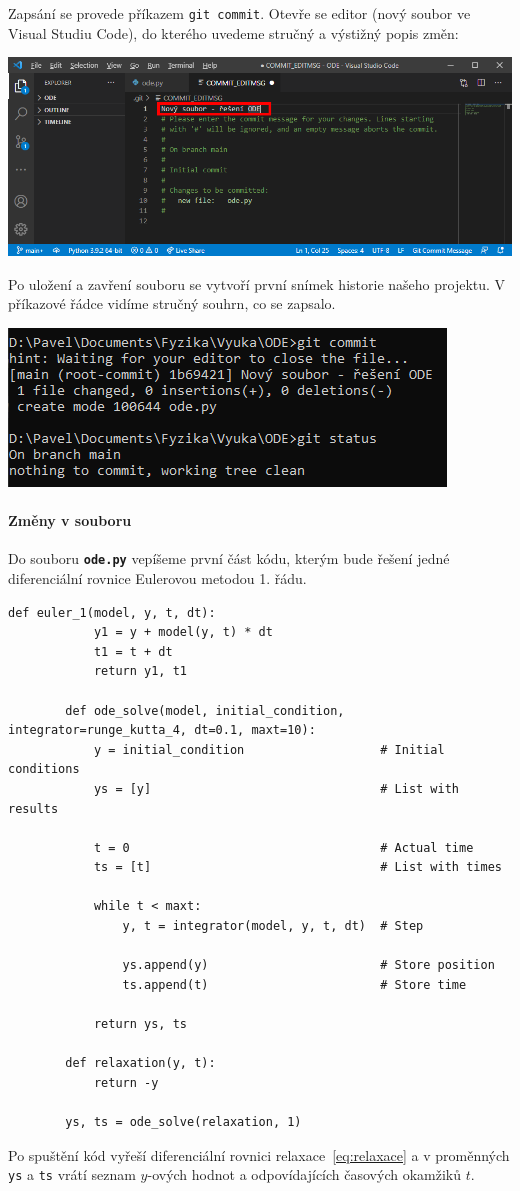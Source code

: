 \documentclass[a4paper,11pt,twoside]{article}
\newcommand{\subsubsubsection}[1]{\paragraph{#1}\mbox{}

}
\def\code#1{\textnormal{\texttt{#1}}}
\def\file#1{\textnormal{\textbf{\texttt{#1}}}}
\theoremstyle{red}
\theoremstyle{green}
\begin{document}
    Zapsání se provede příkazem \code{git commit}.
    Otevře se editor (nový soubor ve Visual Studiu Code), do kterého uvedeme stručný a výstižný popis změn:
    \begin{center}\includegraphics[width=0.9\linewidth]{VSCodeCommit.png}\end{center}
    Po uložení a zavření souboru se vytvoří první snímek historie našeho projektu.
    V příkazové řádce vidíme stručný souhrn, co se zapsalo.
    \begin{center}\includegraphics[width=0.5\linewidth]{GitStatusCommit.png}\end{center}

\subsubsubsection{Změny v souboru}
    Do souboru \file{ode.py} vepíšeme první část kódu, kterým bude řešení jedné diferenciální rovnice Eulerovou metodou 1. řádu.

    \begin{lstlisting}[style=TinyPython]
        def euler_1(model, y, t, dt):
            y1 = y + model(y, t) * dt
            t1 = t + dt
            return y1, t1
        
        def ode_solve(model, initial_condition, integrator=runge_kutta_4, dt=0.1, maxt=10):
            y = initial_condition                   # Initial conditions
            ys = [y]                                # List with results
            
            t = 0                                   # Actual time
            ts = [t]                                # List with times
            
            while t < maxt:
                y, t = integrator(model, y, t, dt)  # Step
                
                ys.append(y)                        # Store position
                ts.append(t)                        # Store time
                    
            return ys, ts
        
        def relaxation(y, t):
            return -y
        
        ys, ts = ode_solve(relaxation, 1)\end{lstlisting}
    Po spuštění kód vyřeší diferenciální rovnici relaxace~\eqref{eq:relaxace} a v proměnných \code{ys} a \code{ts} vrátí seznam $y$-ových hodnot a odpovídajících časových okamžiků $t$.
\end{document}
